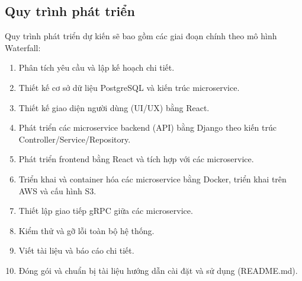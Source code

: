 \subsection{Quy trình phát triển}
\label{sec:intro_process}
Quy trình phát triển dự kiến sẽ bao gồm các giai đoạn chính theo mô hình Waterfall:
\begin{enumerate}
    \item Phân tích yêu cầu và lập kế hoạch chi tiết.
    \item Thiết kế cơ sở dữ liệu PostgreSQL và kiến trúc microservice.
    \item Thiết kế giao diện người dùng (UI/UX) bằng React.
    \item Phát triển các microservice backend (API) bằng Django theo kiến trúc Controller/Service/Repository.
    \item Phát triển frontend bằng React và tích hợp với các microservice.
    \item Triển khai và container hóa các microservice bằng Docker, triển khai trên AWS và cấu hình S3.
    \item Thiết lập giao tiếp gRPC giữa các microservice.
    \item Kiểm thử và gỡ lỗi toàn bộ hệ thống.
    \item Viết tài liệu và báo cáo chi tiết.
    \item Đóng gói và chuẩn bị tài liệu hướng dẫn cài đặt và sử dụng (README.md).
\end{enumerate}

